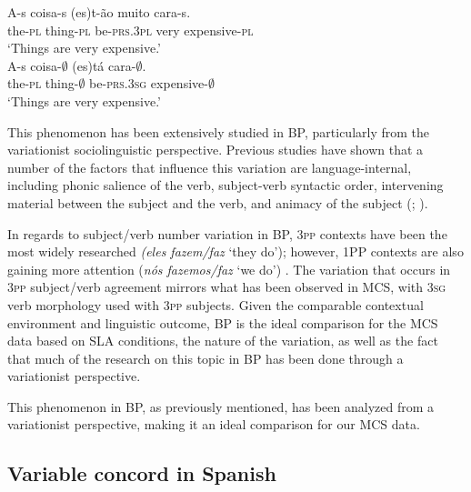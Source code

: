 \documentclass[output=paper,colorlinks,citecolor=brown,
]{langscibook}
\begin{document}
\begin{exe} %
    \ex\label{ex:critchfield:4} 
    \begin{xlist} 
        \ex \label{ex:critchfield:4a}
            \gll A-s  coisa-s (es)t-ão  muito    cara-s.\\  
                 the-\textsc{pl}   thing-\textsc{pl}   be-\textsc{prs}.\textsc{3pl}   very expensive-\textsc{pl}\\
            \glt `Things are very expensive.'\\
        \ex\label{ex:critchfield:4b}
            \gll  A-s coisa-$\emptyset$ (es)tá cara-$\emptyset$.\\
               the-\textsc{pl}   thing-$\emptyset$   be-\textsc{prs}.\textsc{3sg} expensive-$\emptyset$\\
            \glt  `Things are very expensive.'
\end{xlist}
\end{exe}

This phenomenon has been extensively studied in BP, particularly from the variationist sociolinguistic perspective. Previous studies have shown that a number of the factors that influence this variation are language-internal, including phonic salience of the verb, subject-verb syntactic order, intervening material between the subject and the verb, and animacy of the subject (\citealt{naro2000variable}; \citealt{mendes2015variable}). 

In regards to subject/verb number variation in BP, \textsc{3pp} contexts have been the most widely researched \textit{(eles fazem/faz} `they do'); however, 1PP contexts are also gaining more attention (\textit{nós fazemos/faz} `we do') \citep[362]{mendes2015variable}. The variation that occurs in \textsc{3pp} subject/verb agreement mirrors what has been observed in MCS, with \textsc{3sg} verb morphology used with \textsc{3pp} subjects. Given the comparable contextual environment and linguistic outcome, BP is the ideal comparison for the MCS data based on SLA conditions, the nature of the variation, as well as the fact that much of the research on this topic in BP has been done through a variationist perspective. 

This phenomenon in BP, as previously mentioned, has been analyzed from a variationist perspective, making it an ideal comparison for our MCS data.

\subsection{Variable concord in Spanish}
\end{document}
